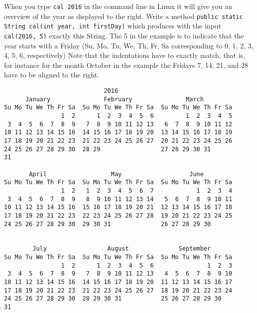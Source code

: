 \documentclass[12pt]{article}
\begin{document}
\begin{enumerate}
\begin{minipage}[t]{0.4\textwidth}
When you type \texttt{cal 2016} in the command line in Linux it
  will give you an overview of the year as displayed to the right.
Write a method \texttt{public static String cal(int year, int
  firstDay)} which produces with the input \texttt{cal(2016, 5)}
exactly this String. The 5 in the example is to indicate that the year
starts with a Friday (Su, Mo, Tu, We, Th, Fr, Sa corresponding to
0, 1, 2, 3, 4, 5, 6, respectively) Note that the indentations have to exactly
match, that is, for instance for the month October in the example the
Fridays 7, 14, 21, and 28 have to be aligned to the right.
\end{minipage}\hfill
\begin{minipage}[t]{0.45\textwidth}
\begin{tiny}
\begin{verbatim}
                            2016
      January               February               March          
Su Mo Tu We Th Fr Sa  Su Mo Tu We Th Fr Sa  Su Mo Tu We Th Fr Sa  
                1  2      1  2  3  4  5  6         1  2  3  4  5  
 3  4  5  6  7  8  9   7  8  9 10 11 12 13   6  7  8  9 10 11 12  
10 11 12 13 14 15 16  14 15 16 17 18 19 20  13 14 15 16 17 18 19  
17 18 19 20 21 22 23  21 22 23 24 25 26 27  20 21 22 23 24 25 26  
24 25 26 27 28 29 30  28 29                 27 28 29 30 31        
31                                                                

       April                  May                   June          
Su Mo Tu We Th Fr Sa  Su Mo Tu We Th Fr Sa  Su Mo Tu We Th Fr Sa  
                1  2   1  2  3  4  5  6  7            1  2  3  4  
 3  4  5  6  7  8  9   8  9 10 11 12 13 14   5  6  7  8  9 10 11  
10 11 12 13 14 15 16  15 16 17 18 19 20 21  12 13 14 15 16 17 18  
17 18 19 20 21 22 23  22 23 24 25 26 27 28  19 20 21 22 23 24 25  
24 25 26 27 28 29 30  29 30 31              26 27 28 29 30        
                                                                  

        July                 August              September        
Su Mo Tu We Th Fr Sa  Su Mo Tu We Th Fr Sa  Su Mo Tu We Th Fr Sa  
                1  2      1  2  3  4  5  6               1  2  3  
 3  4  5  6  7  8  9   7  8  9 10 11 12 13   4  5  6  7  8  9 10  
10 11 12 13 14 15 16  14 15 16 17 18 19 20  11 12 13 14 15 16 17  
17 18 19 20 21 22 23  21 22 23 24 25 26 27  18 19 20 21 22 23 24  
24 25 26 27 28 29 30  28 29 30 31           25 26 27 28 29 30     
31                                                                


\end{verbatim}
\end{tiny}
\end{minipage}
\end{enumerate}
\end{document}
